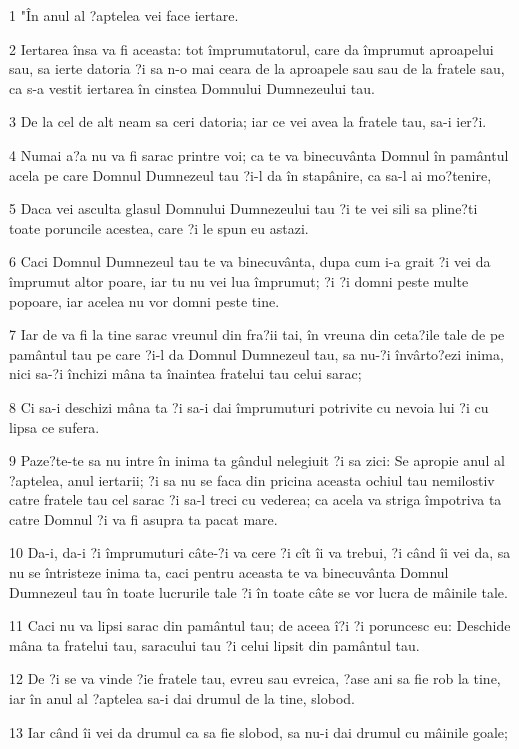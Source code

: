 \par 1 "În anul al ?aptelea vei face iertare.
\par 2 Iertarea însa va fi aceasta: tot împrumutatorul, care da împrumut aproapelui sau, sa ierte datoria ?i sa n-o mai ceara de la aproapele sau sau de la fratele sau, ca s-a vestit iertarea în cinstea Domnului Dumnezeului tau.
\par 3 De la cel de alt neam sa ceri datoria; iar ce vei avea la fratele tau, sa-i ier?i.
\par 4 Numai a?a nu va fi sarac printre voi; ca te va binecuvânta Domnul în pamântul acela pe care Domnul Dumnezeul tau ?i-l da în stapânire, ca sa-l ai mo?tenire,
\par 5 Daca vei asculta glasul Domnului Dumnezeului tau ?i te vei sili sa pline?ti toate poruncile acestea, care ?i le spun eu astazi.
\par 6 Caci Domnul Dumnezeul tau te va binecuvânta, dupa cum i-a grait ?i vei da împrumut altor poare, iar tu nu vei lua împrumut; ?i ?i domni peste multe popoare, iar acelea nu vor domni peste tine.
\par 7 Iar de va fi la tine sarac vreunul din fra?ii tai, în vreuna din ceta?ile tale de pe pamântul tau pe care ?i-l da Domnul Dumnezeul tau, sa nu-?i învârto?ezi inima, nici sa-?i închizi mâna ta înaintea fratelui tau celui sarac;
\par 8 Ci sa-i deschizi mâna ta ?i sa-i dai împrumuturi potrivite cu nevoia lui ?i cu lipsa ce sufera.
\par 9 Paze?te-te sa nu intre în inima ta gândul nelegiuit ?i sa zici: Se apropie anul al ?aptelea, anul iertarii; ?i sa nu se faca din pricina aceasta ochiul tau nemilostiv catre fratele tau cel sarac ?i sa-l treci cu vederea; ca acela va striga împotriva ta catre Domnul ?i va fi asupra ta pacat mare.
\par 10 Da-i, da-i ?i împrumuturi câte-?i va cere ?i cît îi va trebui, ?i când îi vei da, sa nu se întristeze inima ta, caci pentru aceasta te va binecuvânta Domnul Dumnezeul tau în toate lucrurile tale ?i în toate câte se vor lucra de mâinile tale.
\par 11 Caci nu va lipsi sarac din pamântul tau; de aceea î?i ?i poruncesc eu: Deschide mâna ta fratelui tau, saracului tau ?i celui lipsit din pamântul tau.
\par 12 De ?i se va vinde ?ie fratele tau, evreu sau evreica, ?ase ani sa fie rob la tine, iar în anul al ?aptelea sa-i dai drumul de la tine, slobod.
\par 13 Iar când îi vei da drumul ca sa fie slobod, sa nu-i dai drumul cu mâinile goale;
